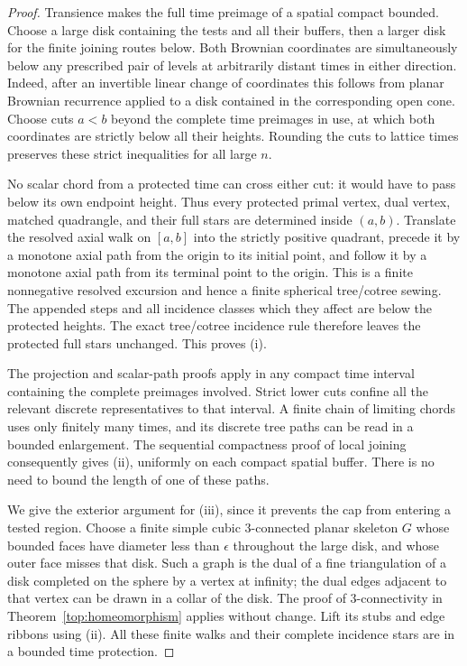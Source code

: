\begin{proof}
Transience makes the full time preimage of a spatial compact bounded.
Choose a large disk containing the tests and all their buffers, then a
larger disk for the finite joining routes below.  Both Brownian
coordinates are simultaneously below any prescribed pair of levels at
arbitrarily distant times in either direction.  Indeed, after an
invertible linear change of coordinates this follows from planar
Brownian recurrence applied to a disk contained in the corresponding
open cone.  Choose cuts $a<b$ beyond the complete time preimages in
use, at which both coordinates are strictly below all their heights.
Rounding the cuts to lattice times preserves these strict inequalities
for all large $n$.

No scalar chord from a protected time can cross either cut: it would
have to pass below its own endpoint height.  Thus every protected
primal vertex, dual vertex, matched quadrangle, and their full stars
are determined inside $(a,b)$.  Translate the resolved axial walk on
$[a,b]$ into the strictly positive quadrant, precede it by a monotone
axial path from the origin to its initial point, and follow it by a
monotone axial path from its terminal point to the origin.  This is a
finite nonnegative resolved excursion and hence a finite spherical
tree/cotree sewing.  The appended steps and all incidence classes
which they affect are below the protected heights.  The exact
tree/cotree incidence rule therefore leaves the protected full stars
unchanged.  This proves (i).

The projection and scalar-path proofs apply in any compact time
interval containing the complete preimages involved.  Strict lower
cuts confine all the relevant discrete representatives to that
interval.  A finite chain of limiting chords uses only finitely many
times, and its discrete tree paths can be read in a bounded enlargement.
The sequential compactness proof of local joining consequently gives
(ii), uniformly on each compact spatial buffer.  There is no need to
bound the length of one of these paths.

We give the exterior argument for (iii), since it prevents the cap
from entering a tested region.  Choose a finite simple cubic
$3$-connected planar skeleton $G$ whose bounded faces have diameter
less than $\epsilon$ throughout the large disk, and whose outer face
misses that disk.  Such a graph is the dual of a fine triangulation
of a disk completed on the sphere by a vertex at infinity; the dual
edges adjacent to that vertex can be drawn in a collar of the disk.
The proof of $3$-connectivity in Theorem~\ref{top:homeomorphism}
applies without change.  Lift its stubs and edge ribbons using (ii).
All these finite walks and their complete incidence stars are in a
bounded time protection.


\end{proof}
